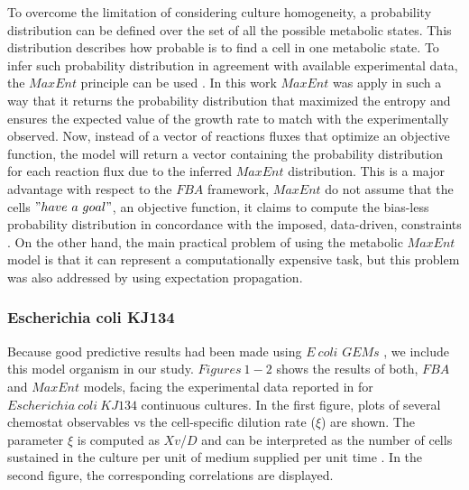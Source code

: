 \documentclass[]{article}
\begin{document}
	To overcome the limitation of considering culture homogeneity, a probability distribution can be defined over the set of all the possible metabolic states.
	This distribution describes how probable is to find a cell in one metabolic state.
	To infer such probability distribution in agreement with available experimental data, the $MaxEnt$ principle can be used  . 
	In this work $MaxEnt$ was apply in such a way that it returns the probability distribution that maximized the entropy and ensures the expected value of the growth rate to match with the experimentally observed.
	Now, instead of a vector of reactions fluxes that optimize an objective function, the model will return a vector containing the probability distribution for each reaction flux due to the inferred $MaxEnt$ distribution. 
	This is a major advantage with respect to the $FBA$ framework, $MaxEnt$ do not assume that the cells $"have\ a\ goal"$, an objective function, it claims to compute the bias-less probability distribution in concordance with the imposed, data-driven, constraints . On the other hand, the main practical problem of using the metabolic $MaxEnt$ model is that it can represent a computationally expensive task, but this problem was also addressed by  using expectation propagation.
	
	
	
	\subsubsection{Escherichia coli KJ134}
	
	Because good predictive results had been made using $E\ coli$ $GEMs$ , we include this model organism in our study.
	$Figures\ 1-2$ shows the results of both, $FBA$ and $MaxEnt$ models, facing the experimental data reported in  for $Escherichia\ coli\ KJ134$ continuous cultures. 
	In the first figure, plots of several chemostat observables vs the cell-specific dilution rate ($\xi$) are shown. 
	The parameter $\xi$ is computed as $Xv$/$D$ and can be interpreted as the number of cells sustained in the culture per unit of medium supplied per unit time . 
	In the second figure, the corresponding correlations are displayed.
	
\end{document}

